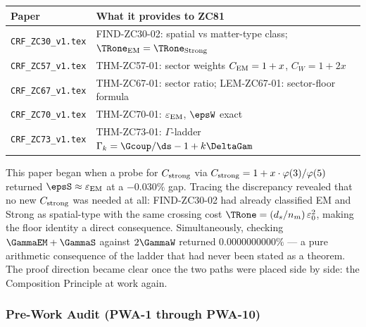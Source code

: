 \documentclass[12pt, a4paper]{article}
\renewcommand{\epsEM}{\varepsilon_{\rm EM}}
\begin{document}
\begin{keybox}[title={Companion Papers --- ZC81}]
{\small\renewcommand{\arraystretch}{1.25}
\begin{center}
\begin{tabular}{@{}p{4.5cm}p{8.0cm}@{}}
\toprule
\textbf{Paper} & \textbf{What it provides to ZC81} \\
\midrule
\texttt{CRF\_ZC30\_v1.tex}
  & FIND-ZC30-02: spatial vs matter-type class;
    $\TRone_{\rm EM} = \TRone_{\rm Strong}$ \\
\texttt{CRF\_ZC57\_v1.tex}
  & THM-ZC57-01: sector weights $C_{\rm EM}=1+x$,
    $C_W=1+2x$ \\
\texttt{CRF\_ZC67\_v1.tex}
  & THM-ZC67-01: sector ratio;
    LEM-ZC67-01: sector-floor formula \\
\texttt{CRF\_ZC70\_v1.tex}
  & THM-ZC70-01: $\epsEM$, $\epsW$ exact \\
\texttt{CRF\_ZC73\_v1.tex}
  & THM-ZC73-01: $\Gamma$-ladder
    $\Gamma_k = \Gcoup/\ds - 1 + k\DeltaGam$ \\
\bottomrule
\end{tabular}
\end{center}}
\end{keybox}

\begin{derivedbox}[title={Discovery Note}]
This paper began when a probe for $C_{\rm strong}$ via
$C_{\rm strong} = 1 + x\cdot\varphi(3)/\varphi(5)$
returned $\epsS \approx \epsEM$ at a $-0.030\%$ gap.
Tracing the discrepancy revealed that no new $C_{\rm strong}$
was needed at all: FIND-ZC30-02 had already classified EM
and Strong as spatial-type with the same crossing cost
$\TRone = (d_s/n_m)\,\varepsilon_0^2$, making the floor
identity a direct consequence. Simultaneously, checking
$\GammaEM + \GammaS$ against $2\GammaW$ returned
$0.0000000000\%$ --- a pure arithmetic consequence of the
ladder that had never been stated as a theorem.
The proof direction became clear once the two paths were placed
side by side: the Composition Principle at work again.
\end{derivedbox}

\subsubsection{Pre-Work Audit (PWA-1 through PWA-10)}
\end{document}
